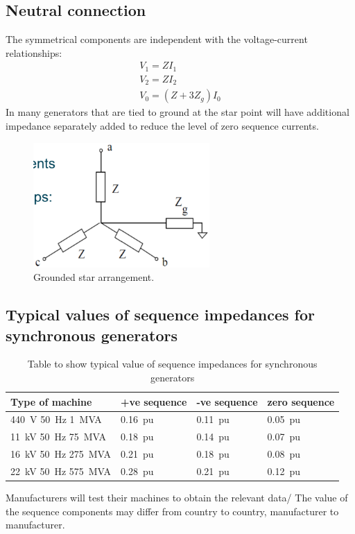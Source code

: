 \subsection{Neutral connection}
The symmetrical components are independent with the voltage-current relationships:
\begin{gather}
	V_1 = ZI_1\\
	V_2 = ZI_2\\
	V_0 = \left(Z + 3Z_g\right)I_0
\end{gather}
In many generators that are tied to ground at the star point will have additional impedance separately added to reduce the level of zero sequence currents.
\begin{figure}[H]
	\centering
	\includegraphics[width = 0.6\textwidth]{./img/figure34.png}
	\caption{Grounded star arrangement.}
\end{figure}
\subsection{Typical values of sequence impedances for synchronous generators}
\begin{table}
	\centering
	\begin{tabular}{@{}llll@{}}
		\toprule
		Type of machine                           & +ve sequence  & -ve sequence  & zero sequence \\
		\midrule
		\SI{440}{V} \SI{50}{\hertz} \SI{1}{MVA}   & \SI{0.16}{pu} & \SI{0.11}{pu} & \SI{0.05}{pu} \\
		\SI{11}{kV} \SI{50}{\hertz} \SI{75}{MVA}  & \SI{0.18}{pu} & \SI{0.14}{pu} & \SI{0.07}{pu} \\
		\SI{16}{kV} \SI{50}{\hertz} \SI{275}{MVA} & \SI{0.21}{pu} & \SI{0.18}{pu} & \SI{0.08}{pu} \\
		\SI{22}{kV} \SI{50}{\hertz} \SI{575}{MVA} & \SI{0.28}{pu} & \SI{0.21}{pu} & \SI{0.12}{pu} \\
		\bottomrule
	\end{tabular}
	\caption{Table to show typical value of sequence impedances for synchronous generators}
\end{table}
Manufacturers will test their machines to obtain the relevant data/ The value of the sequence components may differ from country to country, manufacturer to manufacturer.
